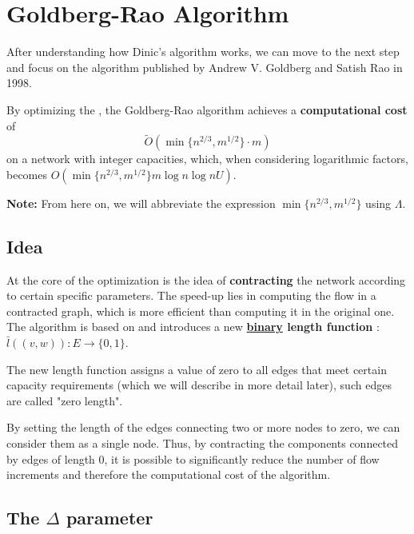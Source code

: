 
\chapter{Goldberg-Rao Algorithm}

\label{chap:gbr}
After understanding how Dinic's algorithm works, we can move to the next step and focus on the algorithm published by Andrew V. Goldberg and Satish Rao in 1998.

\noindent By optimizing the , the Goldberg-Rao algorithm achieves a \textbf{computational cost} of 
\[
\tilde{O}(\min\{n^{2/3}, m^{1/2}\} \cdot m)
\]
on a network with integer capacities, which, when considering logarithmic factors, becomes \( O(\min\{n^{2/3}, m^{1/2}\} m \log n \log nU) \).

\textbf{Note:} From here on, we will abbreviate the expression \( \min\{n^{2/3}, m^{1/2}\} \) using \( \Lambda \).

\section{Idea}

    At the core of the optimization is the idea of \textbf{contracting} the network according to certain specific parameters.  
    The speed-up lies in computing the flow in a contracted graph, which is more efficient than computing it in the original one.
    The algorithm is based on  and introduces a new  \textbf{\underline{binary} length function} : \( \bar{l}((v,w)): E \rightarrow \{0,1\} \).  

    The new length function assigns a value of zero to all edges that meet certain capacity requirements (which we will describe in more detail later), such edges are called "zero length".

    By setting the length of the edges connecting two or more nodes to zero, we can consider them as a single node.  
    Thus, by contracting the components connected by edges of length 0, it is possible to significantly reduce the number of flow increments and therefore the computational cost of the algorithm.

\section{The $\Delta$ parameter}

